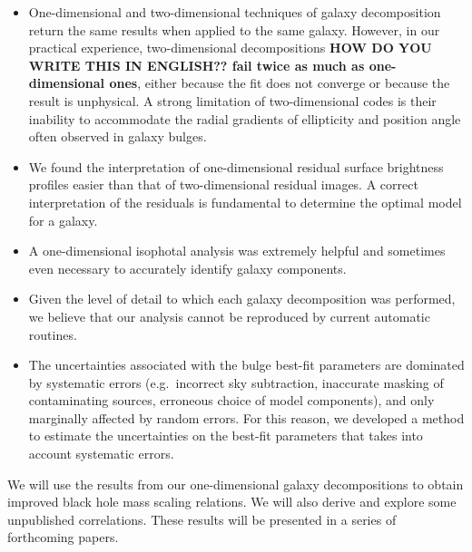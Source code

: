 \documentclass[preprint2]{emulateapj}
\begin{document}
\begin{itemize}
\item One-dimensional and two-dimensional techniques of galaxy decomposition return the same results when applied to the same galaxy.
However, in our practical experience, two-dimensional decompositions {\bf HOW DO YOU WRITE THIS IN ENGLISH?? fail twice as much as one-dimensional ones}, 
either because the fit does not converge or because the result is unphysical. 
A strong limitation of two-dimensional codes is their inability to accommodate the radial gradients of ellipticity and position angle 
often observed in galaxy bulges.
\item We found the interpretation of one-dimensional residual surface brightness profiles easier than that of two-dimensional residual images. 
A correct interpretation of the residuals is fundamental to determine the optimal model for a galaxy.
\item A one-dimensional isophotal analysis was extremely helpful and sometimes even necessary to accurately identify galaxy components.
\item Given the level of detail to which each galaxy decomposition was performed, 
we believe that our analysis cannot be reproduced by current automatic routines. 
\item The uncertainties associated with the bulge best-fit parameters are dominated by systematic errors (e.g.~incorrect sky subtraction, 
inaccurate masking of contaminating sources, erroneous choice of model components), and only marginally affected by random errors. 
For this reason, we developed a method to estimate the uncertainties on the best-fit parameters that takes into account systematic errors.
\end{itemize}

We will use the results from our one-dimensional galaxy decompositions to obtain improved black hole mass scaling relations. 
We will also derive and explore some unpublished correlations. 
These results will be presented in a series of forthcoming papers.


\end{document}
